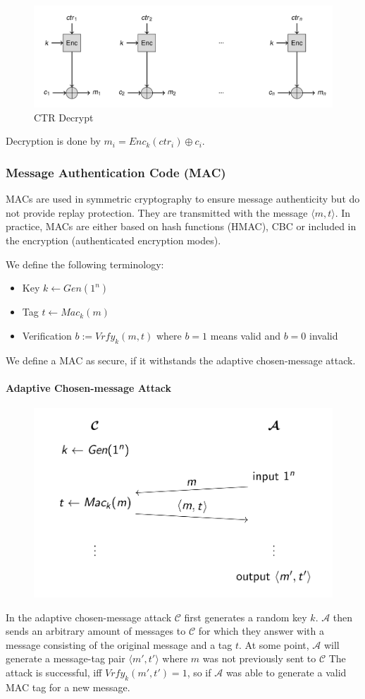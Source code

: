 \begin{figure}[H]
  \centering
  \includegraphics[width=.8\textwidth]{figures/ctr_decrypt.png}
  \caption{CTR Decrypt}
\end{figure}
Decryption is done by $m_i = Enc_k(ctr_i) \oplus c_i$.

\subsubsection{Message Authentication Code (MAC)}
MACs are used in symmetric cryptography to ensure message authenticity but do not provide replay protection.
They are transmitted with the message $\langle m,t \rangle$.
In practice, MACs are either based on hash functions (HMAC), CBC or included in the encryption (authenticated encryption modes).

We define the following terminology:
\begin{itemize}[noitemsep,topsep=0pt]
  \item Key $k \leftarrow Gen(1^n)$
  \item Tag $t \leftarrow Mac_k(m)$
  \item Verification $b := Vrfy_k(m,t)$ where $b=1$ means valid and $b=0$ invalid
\end{itemize}

We define a MAC as secure, if it withstands the adaptive chosen-message attack.

\paragraph{Adaptive Chosen-message Attack}
\begin{figure}[H]
  \centering
  \includegraphics[width=.7\textwidth]{figures/adaptive_chosen-message_attack.png}
\end{figure}
In the adaptive chosen-message attack $\mathcal{C}$ first generates a random key $k$.
$\mathcal{A}$ then sends an arbitrary amount of messages to $\mathcal{C}$ for which they answer with a message consisting of the original message and a tag $t$.
At some point, $\mathcal{A}$ will generate a message-tag pair $\langle m',t' \rangle$ where $m$ was not previously sent to $\mathcal{C}$
The attack is successful, iff $Vrfy_k(m',t') = 1$, so if $\mathcal{A}$ was able to generate a valid MAC tag for a new message.


